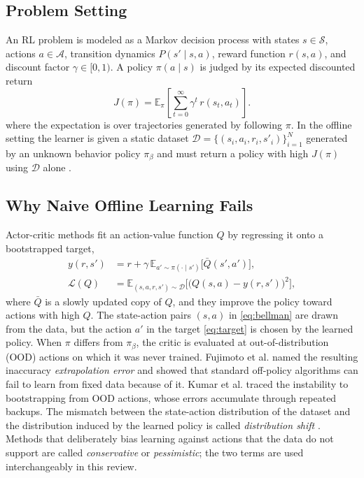 \documentclass[journal]{IEEEtran}
\begin{document}
\subsection{Problem Setting}
An RL problem is modeled as a Markov decision process with states $s \in \mathcal{S}$, actions $a \in \mathcal{A}$, transition dynamics $P(s' \mid s,a)$, reward function $r(s,a)$, and discount factor $\gamma \in [0,1)$. A policy $\pi(a \mid s)$ is judged by its expected discounted return
\begin{equation}
J(\pi) = \mathbb{E}_{\pi}\!\left[\sum_{t=0}^{\infty} \gamma^{t}\, r(s_t,a_t)\right].
\label{eq:return}
\end{equation}
where the expectation is over trajectories generated by following $\pi$. In the offline setting the learner is given a static dataset $\mathcal{D} = \{(s_i,a_i,r_i,s'_i)\}_{i=1}^{N}$ generated by an unknown behavior policy $\pi_\beta$ and must return a policy with high $J(\pi)$ using $\mathcal{D}$ alone \cite{levine2020tutorial}.

\subsection{Why Naive Offline Learning Fails}
Actor-critic methods fit an action-value function $Q$ by regressing it onto a bootstrapped target,
\begin{align}
y(r,s') &= r + \gamma\, \mathbb{E}_{a' \sim \pi(\cdot \mid s')}\big[\bar{Q}(s',a')\big], \label{eq:target}\\
\mathcal{L}(Q) &= \mathbb{E}_{(s,a,r,s') \sim \mathcal{D}}\Big[\big(Q(s,a) - y(r,s')\big)^{2}\Big], \label{eq:bellman}
\end{align}
where $\bar{Q}$ is a slowly updated copy of $Q$, and they improve the policy toward actions with high $Q$. The state-action pairs $(s,a)$ in \eqref{eq:bellman} are drawn from the data, but the action $a'$ in the target \eqref{eq:target} is chosen by the learned policy. When $\pi$ differs from $\pi_\beta$, the critic is evaluated at out-of-distribution (OOD) actions on which it was never trained. Fujimoto et al. \cite{fujimoto2019bcq} named the resulting inaccuracy \emph{extrapolation error} and showed that standard off-policy algorithms can fail to learn from fixed data because of it. Kumar et al. \cite{kumar2019bear} traced the instability to bootstrapping from OOD actions, whose errors accumulate through repeated backups. The mismatch between the state-action distribution of the dataset and the distribution induced by the learned policy is called \emph{distribution shift} \cite{levine2020tutorial}. Methods that deliberately bias learning against actions that the data do not support are called \emph{conservative} or \emph{pessimistic}; the two terms are used interchangeably in this review.
\end{document}
